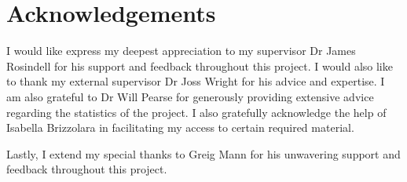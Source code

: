 \documentclass[11pt, a4paper, titlepage]{article}
\begin{document}
    \clearpage
    \section*{Acknowledgements}
    I would like express my deepest appreciation to my supervisor Dr James Rosindell for his support and feedback throughout this project. I would also like to thank my external supervisor Dr Joss Wright for his advice and expertise. I am also grateful to Dr Will Pearse for generously providing extensive advice regarding the statistics of the project. I also gratefully acknowledge the help of Isabella Brizzolara in facilitating my access to certain required material.
    
    Lastly, I extend my special thanks to Greig Mann for his unwavering support and feedback throughout this project.
    
    \newpage
    
    
\end{document}
